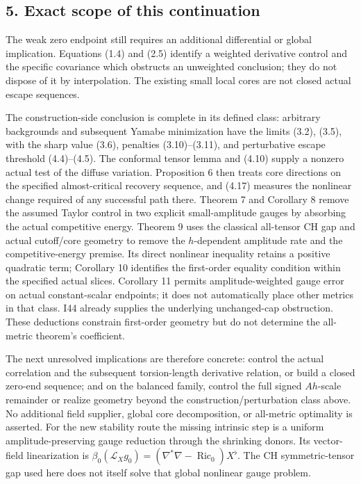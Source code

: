 \documentclass[
  10pt,
]{article}
\begin{document}
\hypertarget{exact-scope-of-this-continuation}{%
\subsection{5. Exact scope of this
continuation}\label{exact-scope-of-this-continuation}}

The weak zero endpoint still requires an additional differential or
global implication. Equations (1.4) and (2.5) identify a weighted
derivative control and the specific covariance which obstructs an
unweighted conclusion; they do not dispose of it by interpolation. The
existing small local cores are not closed actual escape sequences.

The construction-side conclusion is complete in its defined class:
arbitrary backgrounds and subsequent Yamabe minimization have the limits
(3.2), (3.5), with the sharp value (3.6), penalties (3.10)--(3.11), and
perturbative escape threshold (4.4)--(4.5). The conformal tensor lemma
and (4.10) supply a nonzero actual test of the diffuse variation.
Proposition 6 then treats core directions on the specified
almost-critical recovery sequence, and (4.17) measures the nonlinear
change required of any successful path there. Theorem 7 and Corollary 8
remove the assumed Taylor control in two explicit small-amplitude gauges
by absorbing the actual competitive energy. Theorem 9 uses the classical
all-tensor CH gap and actual cutoff/core geometry to remove the
\(h\)-dependent amplitude rate and the competitive-energy premise. Its
direct nonlinear inequality retains a positive quadratic term; Corollary
10 identifies the first-order equality condition within the specified
actual slices. Corollary 11 permits amplitude-weighted gauge error on
actual constant-scalar endpoints; it does not automatically place other
metrics in that class. I44 already supplies the underlying unchanged-cap
obstruction. These deductions constrain first-order geometry but do not
determine the all-metric theorem's coefficient.

The next unresolved implications are therefore concrete: control the
actual correlation and the subsequent torsion-length derivative
relation, or build a closed zero-end sequence; and on the balanced
family, control the full signed \(Ah\)-scale remainder or realize
geometry beyond the construction/perturbation class above. No additional
field supplier, global core decomposition, or all-metric optimality is
asserted. For the new stability route the missing intrinsic step is a
uniform amplitude-preserving gauge reduction through the shrinking
donors. Its vector-field linearization is
\(\beta_0(\mathcal L_Xg_0)=(\nabla^*\nabla-\operatorname{Ric}_0)X^\flat\).
The CH symmetric-tensor gap used here does not itself solve that global
nonlinear gauge problem.
\end{document}
